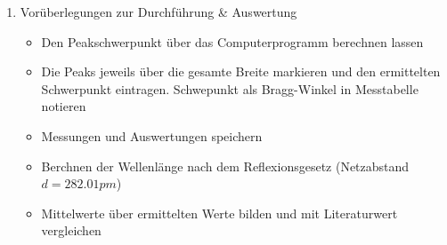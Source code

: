 \documentclass{article}
\begin{document}
\begin{enumerate}[label = (\Roman*)]
    \item Vorüberlegungen zur Durchführung \& Auswertung
        \begin{itemize}
            \item Den Peakschwerpunkt über das Computerprogramm berechnen lassen
            \item Die Peaks jeweils über die gesamte Breite markieren und den ermittelten Schwerpunkt eintragen. Schwepunkt als Bragg-Winkel in Messtabelle notieren
            \item Messungen und Auswertungen speichern
            \item Berchnen der Wellenlänge nach dem Reflexionsgesetz (Netzabstand $d=282.01pm$)
            \item Mittelwerte über ermittelten Werte bilden und mit Literaturwert vergleichen   
        \end{itemize}
    
\end{enumerate}

\newpage
\end{document}
